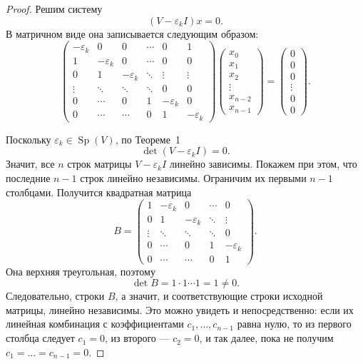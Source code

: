 \documentclass[12pt,a4paper]{article}
\theoremstyle{definition}
\theoremstyle{remark}
\DeclareMathOperator{\Sp}{Sp}
\newcommand{\eps}{\varepsilon}
\begin{document}
\begin{proof}
Решим систему
\[
  (V-\eps_k I)x=0.
\]
В матричном виде она записывается следующим образом:
\[
  \begin{pmatrix}
    -\eps_k & 0       & 0       & \cdots & 0       & 1\\
    1       & -\eps_k & 0       & \cdots & 0       & 0\\
    0       & 1       & -\eps_k & \ddots & \vdots  & \vdots\\
    \vdots  & \ddots  & \ddots  & \ddots & 0       & 0\\
    0       & \cdots  & 0       & 1      & -\eps_k & 0\\
    0       & \cdots  & \cdots  & 0      & 1       & -\eps_k
  \end{pmatrix}
  \begin{pmatrix}
    x_0\\ x_1\\ x_2\\ \vdots\\ x_{n-2}\\ x_{n-1}
  \end{pmatrix}
  =
  \begin{pmatrix}
    0\\0\\0\\\vdots\\0\\0
  \end{pmatrix}.
\]

Поскольку $\eps_k\in\Sp(V)$, по Теореме~1
\[
  \det(V-\eps_k I)=0.
\]
Значит, все $n$ строк матрицы $V-\eps_kI$ линейно зависимы. Покажем при
этом, что последние $n-1$ строк линейно независимы. Ограничим их первыми
$n-1$ столбцами. Получится квадратная матрица
\[
  B=
  \begin{pmatrix}
    1      & -\eps_k & 0        & \cdots & 0\\
    0      & 1       & -\eps_k  & \ddots & \vdots\\
    \vdots & \ddots  & \ddots   & \ddots & 0\\
    0      & \cdots  & 0        & 1      & -\eps_k\\
    0      & \cdots  & \cdots   & 0      & 1
  \end{pmatrix}.
\]
Она верхняя треугольная, поэтому
\[
  \det B=1\cdot1\cdots1=1\ne0.
\]
Следовательно, строки $B$, а значит, и соответствующие строки исходной
матрицы, линейно независимы. Это можно увидеть и непосредственно: если их
линейная комбинация с коэффициентами $c_1,\dots,c_{n-1}$ равна нулю, то из
первого столбца следует $c_1=0$, из второго --- $c_2=0$, и так далее, пока
не получим $c_1=\dots=c_{n-1}=0$.


\end{proof}
\end{document}
